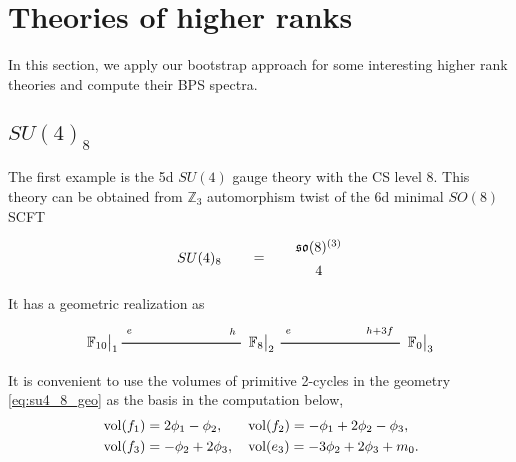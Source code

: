 \section{Theories of higher ranks}\label{sec:higher rank theories}

In this section, we apply our bootstrap approach for some interesting higher rank theories and compute their BPS spectra.


\subsection{\texorpdfstring{$SU(4)_8$}{SU(4)8}}\label{sec:SU(4)8}

The first example is the 5d $ SU(4) $ gauge theory with the CS level 8. This theory can be obtained from $\mathbb{Z}_3$ automorphism twist of the 6d minimal $SO(8)$ SCFT
\begin{align}
\begin{tikzpicture}
\draw (0, 0) node {$ SU(4)_8 $}
(1.5, 0) node {$ = $}
(3, 0.3) node {$ \mathfrak{so}(8)^{(3)} $}
(3, -0.3) node {$ 4 $}
;
\end{tikzpicture}
\end{align}
It has a geometric realization as \cite{Bhardwaj:2019fzv}
\begin{align}\label{eq:su4_8_geo}
\begin{tikzpicture}
\draw (0, 0) node {$ \eval{\mathbb{F}_{10}}_1 $}
(4, 0) node {$ \eval{\mathbb{F}_8}_2 $}
(8, 0) node {$ \eval{\mathbb{F}_0}_3 $};
\draw [thick](0.5, 0) -- (3.5, 0);
\draw [thick] (4.5, 0) -- (7.5, 0);
\draw (0.7, 0.3) node {$ _{e} $}
(3.3, 0.3) node {$ _h $}
(4.7, 0.3) node {$ _e $}
(7, 0.3) node {$ _{h + 3f} $}
;
\end{tikzpicture}
\end{align}
It is convenient to use the volumes of primitive 2-cycles in the geometry \eqref{eq:su4_8_geo} as the basis in the computation below,
\begin{align}\label{eq:su4_8_vol}
&\operatorname{vol} (f_1) = 2\phi_1 - \phi_2, 
&&\operatorname{vol} (f_2) = -\phi_1 + 2\phi_2 - \phi_3, \nonumber \\
&\operatorname{vol} (f_3) = -\phi_2 + 2\phi_3,
&&\operatorname{vol} (e_3) = -3\phi_2 + 2\phi_3 + m_0.
\end{align}

